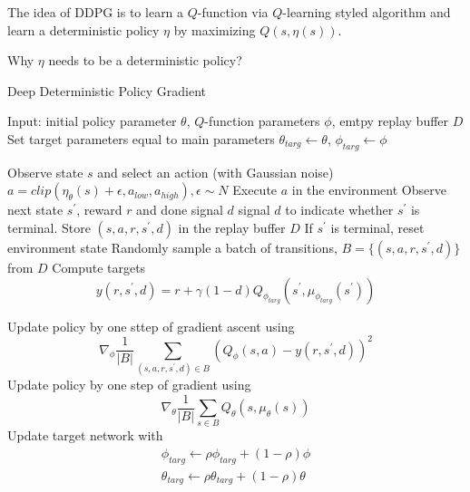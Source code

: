 \documentclass{article}
\begin{document}
The idea of DDPG is to learn a $Q$-function via $Q$-learning styled 
algorithm and learn a deterministic policy $\eta$ by maximizing 
$Q(s, \eta(s))$. 

Why $\eta$ needs to be a deterministic policy? 

\begin{algorithm}[H]
\caption{Deep Deterministic Policy Gradient}
\label{alg}
\end{algorithm}

\begin{algorithmic}
\STATE Input: initial policy parameter $\theta$, $Q$-function 
parameters $\phi$, emtpy replay buffer $D$
\STATE Set target parameters equal to main parameters 
$\theta_{targ} \leftarrow \theta$, $\phi_{targ} \leftarrow \phi$

\REPEAT
\STATE Observe state $s$ and select an action (with Gaussian noise)
$a = clip(\eta_{\theta}(s) + \epsilon, a_{low}, a_{high}), 
\epsilon \sim N$
\STATE Execute $a$ in the environment
\STATE Observe next state $s^{\prime}$, reward $r$ and done signal 
$d$ signal $d$ to indicate whether $s^{\prime}$ is terminal.
\STATE Store $(s, a, r, s^{\prime}, d)$ in the replay buffer $D$
\STATE If $s^{\prime}$ is terminal, reset environment state 
\STATE Randomly sample a batch of transitions, 
$B = \{(s, a, r, s^{\prime}, d)\}$ from $D$
\STATE Compute targets
\[
    y(r, s^{\prime}, d) = r + \gamma(1-d)Q_{\phi_{targ}}(
        s^{\prime}, \mu_{\phi_{targ}}(s^{\prime})
        )
\]

\STATE Update policy by one sttep of gradient ascent using
\[
\nabla_{\phi}\frac{1}{|B|}\sum_{(s,a,r,s^{\prime},d)\in B}
(Q_{\phi}(s, a) - y(r, s^{\prime}, d))^2
\]
\STATE Update policy by one step of gradient using
\[
    \nabla_{\theta} \frac{1}{|B|}\sum_{s\in B} 
        Q_{\theta}(s, \mu_{\theta}(s))
\]
\STATE Update target network with 
\begin{align}
    \phi_{targ} \leftarrow \rho \phi_{targ} + (1-\rho)\phi \\
    \theta_{targ} \leftarrow \rho \theta_{targ} + (1-\rho)\theta
\end{align}
\ENDFOR
\ENDIF
{}

\end{algorithmic}
\end{document}
